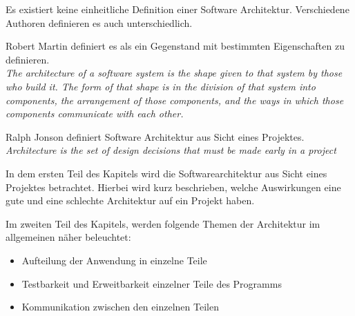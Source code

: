 Es existiert keine einheitliche Definition einer Software Architektur. Verschiedene Authoren definieren es auch unterschiedlich.

Robert Martin definiert es als ein Gegenstand mit bestimmten Eigenschaften zu definieren.\\
\textit{The architecture of a software system is the shape given to that system by those who build it. 
The form of that shape is in the division of that system into components, the arrangement of those components, 
and the ways in which those components communicate with each other.} \cite[136]{cleanArchitecture}

Ralph Jonson definiert Software Architektur aus Sicht eines Projektes.\\
\textit{Architecture is the set of design decisions that must be made early in a project}
\cite{MF_WhatIsSA}

In dem ersten Teil des Kapitels wird die Softwarearchitektur aus Sicht eines Projektes betrachtet.
Hierbei wird kurz beschrieben, welche Auswirkungen eine gute und eine schlechte Architektur auf ein Projekt haben.

Im zweiten Teil des Kapitels, werden folgende Themen der Architektur im allgemeinen näher beleuchtet:
\begin{itemize}
    \item Aufteilung der Anwendung in einzelne Teile
    \item Testbarkeit und Erweitbarkeit einzelner Teile des Programms
    \item Kommunikation zwischen den einzelnen Teilen
\end{itemize}